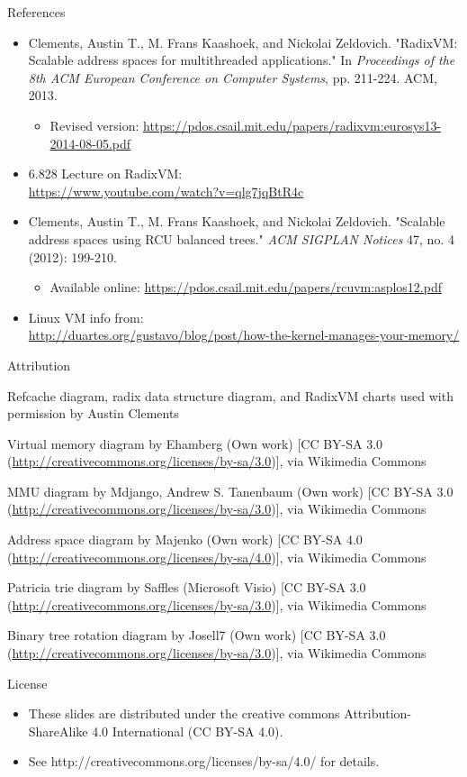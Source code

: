 \documentclass[aspectratio=169]{beamer}
\newcommand{\bi}{\begin{itemize}}
\newcommand{\ei}{\end{itemize}}
\begin{document}
\begin{frame}[noframenumbering]{References}
  \bi
\item Clements, Austin T., M. Frans Kaashoek, and Nickolai Zeldovich. "RadixVM: Scalable address spaces for multithreaded applications." In \emph{Proceedings of the 8th ACM European Conference on Computer Systems}, pp. 211-224. ACM, 2013.
  \bi
\item Revised version: \url{https://pdos.csail.mit.edu/papers/radixvm:eurosys13-2014-08-05.pdf}
  \ei
\item 6.828 Lecture on RadixVM:\\
  \url{https://www.youtube.com/watch?v=qlg7jqBtR4c}
\item Clements, Austin T., M. Frans Kaashoek, and Nickolai Zeldovich. "Scalable address spaces using RCU balanced trees." \emph{ACM SIGPLAN Notices} 47, no. 4 (2012): 199-210.
  \bi
\item Available online: \url{https://pdos.csail.mit.edu/papers/rcuvm:asplos12.pdf}
  \ei
\item Linux VM info from:\\ \url{http://duartes.org/gustavo/blog/post/how-the-kernel-manages-your-memory/}
  \ei
\end{frame}

\begin{frame}[noframenumbering]{Attribution}
  \bi
  {\small
\item Refcache diagram, radix data structure diagram, and RadixVM charts used with permission by Austin Clements
\item Virtual memory diagram by Ehamberg (Own work) [CC BY-SA 3.0 (\url{http://creativecommons.org/licenses/by-sa/3.0})], via Wikimedia Commons
  \item MMU diagram by Mdjango, Andrew S. Tanenbaum (Own work) [CC BY-SA 3.0 (\url{http://creativecommons.org/licenses/by-sa/3.0})], via Wikimedia Commons
\item Address space diagram by Majenko (Own work) [CC BY-SA 4.0 (\url{http://creativecommons.org/licenses/by-sa/4.0})], via Wikimedia Commons
\item Patricia trie diagram by Saffles (Microsoft Visio) [CC BY-SA 3.0 (\url{http://creativecommons.org/licenses/by-sa/3.0})], via Wikimedia Commons
  \item Binary tree rotation diagram by Josell7 (Own work) [CC BY-SA 3.0 (\url{http://creativecommons.org/licenses/by-sa/3.0})], via Wikimedia Commons}
  \ei
\end{frame}

\begin{frame}[noframenumbering]{License}
  \bi
\item These slides are distributed under the creative commons
  Attribution-ShareAlike 4.0 International (CC BY-SA 4.0).
\item See http://creativecommons.org/licenses/by-sa/4.0/ for details.
  \ei
\end{frame}
\end{document}

